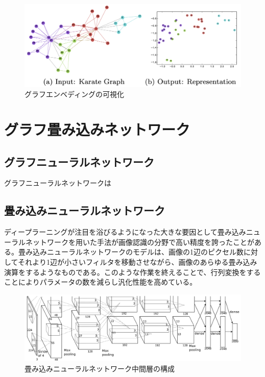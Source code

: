 \begin{figure}[h]
  \centering
  \includegraphics[width=0.7\hsize]{figures/embedding.pdf}
  \caption{グラフエンベディングの可視化}
  \label{fig:ex1}
\end{figure}







\section{グラフ畳み込みネットワーク}
\subsection{グラフニューラルネットワーク}
グラフニューラルネットワークは

\subsection{畳み込みニューラルネットワーク}
ディープラーニングが注目を浴びるようになった大きな要因として畳み込みニューラルネットワークを用いた手法\cite{imagenet}が画像認識の分野で高い精度を誇ったことがある。畳み込みニューラルネットワークのモデルは、画像の1辺のピクセル数に対してそれより1辺が小さいフィルタを移動させながら、画像のあらゆる畳み込み演算をするようなものである。このような作業を終えることで、行列変換をすることによりパラメータの数を減らし汎化性能を高めている。

\begin{figure}[h]
  \centering
  \includegraphics[width=\hsize]{figures/cnn.pdf}
  \caption{畳み込みニューラルネットワーク中間層の構成}
  \label{fig:ex1}
\end{figure}

